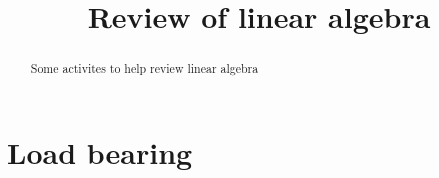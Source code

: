 \documentclass{xourse}
\title{Review of linear algebra}
\begin{document}
\begin{abstract}
    Some activites to help review linear algebra
\end{abstract}
\maketitle

\part{Load bearing}

\end{document}
